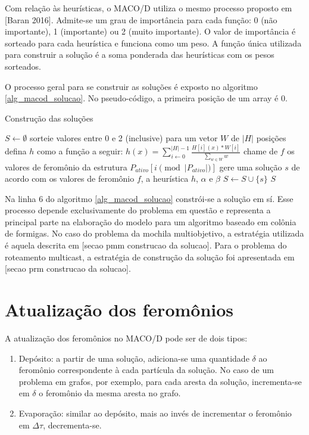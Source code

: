 Com relação às heurísticas, o MACO/D utiliza o mesmo processo proposto em [Baran 2016]. Admite-se um grau de importância para cada função: 0 (não importante), 1 (importante) ou 2 (muito importante). O valor de importância é sorteado para cada heurística e funciona como um peso. A função única utilizada para construir a solução é a soma ponderada das heurísticas com os pesos sorteados.

O processo geral para se construir as soluções é exposto no algoritmo \ref{alg_macod_solucao}. No pseudo-código, a primeira posição de um array é 0.

\begin{algorithm}
	\caption{Construção das soluções}
	\label{alg_macod_solucao}
	\begin{algorithmic}[1]
		\State $S \gets \emptyset$
			\State sorteie valores entre 0 e 2 (inclusive) para um vetor $W$ de $|H|$ posições
			\State defina $h$ como a função a seguir: $h(x) = \sum_{i \gets 0}^{|H|-1}\frac{H[i](x) * W[i]}{\sum\limits_{w \in W}w}$
			\State chame de $f$ os valores de feromônio da estrutura $P_{ativo}[i \pmod{|P_{ativo}|}]$
			\State gere uma solução $s$ de acordo com os valores de feromônio $f$, a heurística $h$, $\alpha$ e $\beta$
			\State $S \gets S \cup \{s\}$
		\EndFor
		\State \Return $S$
	\end{algorithmic}
\end{algorithm}

Na linha 6 do algoritmo \ref{alg_macod_solucao} constrói-se a solução em sí. Esse processo depende exclusivamente do problema em questão e representa a principal parte na elaboração do modelo para um algoritmo baseado em colônia de formigas. No caso do problema da mochila multiobjetivo, a estratégia utilizada é aquela descrita em [secao pmm construcao da solucao]. Para o problema do roteamento multicast, a estratégia de construção da solução foi apresentada em [secao prm construcao da solucao].

\section{Atualização dos feromônios}

A atualização dos feromônios no MACO/D pode ser de dois tipos:

\begin{enumerate}
	\item Depósito: a partir de uma solução, adiciona-se uma quantidade $\delta$ ao feromônio correspondente à cada partícula da solução. No caso de um problema em grafos, por exemplo, para cada aresta da solução, incrementa-se em $\delta$ o feromônio da mesma aresta no grafo.
	\item Evaporação: similar ao depósito, mais ao invés de incrementar o feromônio em $\Delta\tau$, decrementa-se.
\end{enumerate}

